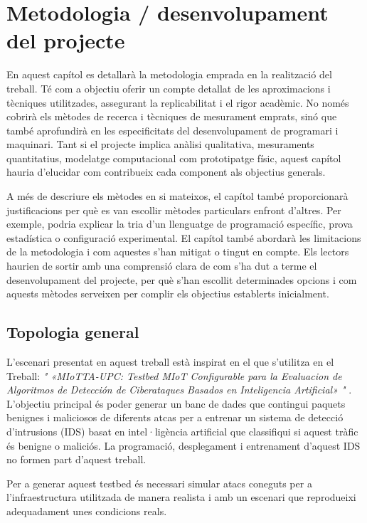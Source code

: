 

\chapter{Metodologia / desenvolupament del projecte}
  
  En aquest capítol es detallarà la metodologia emprada en la realització del treball. Té com a objectiu oferir un compte detallat de les aproximacions i tècniques utilitzades, assegurant la replicabilitat i el rigor acadèmic. No només cobrirà els mètodes de recerca i tècniques de mesurament emprats, sinó que també aprofundirà en les especificitats del desenvolupament de programari i maquinari. Tant si el projecte implica anàlisi qualitativa, mesuraments quantitatius, modelatge computacional com prototipatge físic, aquest capítol hauria d'elucidar com contribueix cada component als objectius generals.
  
  A més de descriure els mètodes en si mateixos, el capítol també proporcionarà justificacions per què es van escollir mètodes particulars enfront d'altres. Per exemple, podria explicar la tria d'un llenguatge de programació específic, prova estadística o configuració experimental. El capítol també abordarà les limitacions de la metodologia i com aquestes s'han mitigat o tingut en compte. Els lectors haurien de sortir amb una comprensió clara de com s'ha dut a terme el desenvolupament del projecte, per què s'han escollit determinades opcions i com aquests mètodes serveixen per complir els objectius establerts inicialment.

\section{Topologia general}
\label{sec:Topologia}

  L’escenari presentat en aquest treball està inspirat en el que s'utilitza en el Treball: \textit{" «MIoTTA-UPC: Testbed MIoT Configurable para la Evaluacion de Algoritmos de Detección de Ciberataques Basados en Inteligencia Artificial» "} \cite{miottaupcfig} . L’objectiu principal és poder generar un banc de dades que contingui paquets benignes i maliciosos de diferents atcas per a entrenar un sistema de detecció d’intrusions (IDS) basat en intel·ligència artificial que classifiqui si aquest tràfic és benigne o maliciós. La programació, desplegament i entrenament d’aquest IDS no formen part d’aquest treball. 
  
  Per a generar aquest testbed és necessari simular atacs coneguts per a l'infraestructura utilitzada de manera realista i amb un escenari que reprodueixi adequadament unes condicions reals.

